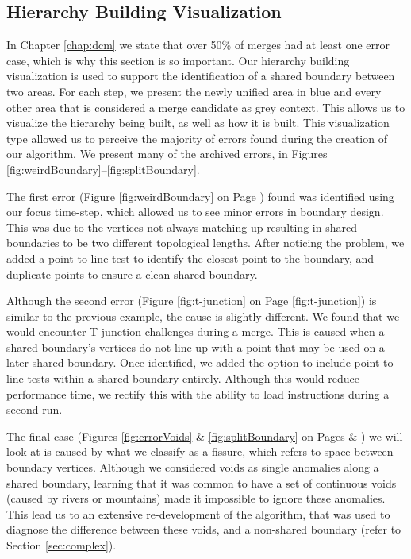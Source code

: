 \subsection{Hierarchy Building Visualization}
In Chapter \ref{chap:dcm} we state that over 50\% of merges had at least one error case, which is why this section is so important. Our hierarchy building visualization is used to support the identification of a shared boundary between two areas. For each step, we present the newly unified area in blue and every other area that is considered a merge candidate as grey context. This allows us to visualize the hierarchy being built, as well as how it is built. This visualization type allowed us to perceive the majority of errors found during the creation of our algorithm. We present many of the archived errors, in Figures \ref{fig:weirdBoundary}--\ref{fig:splitBoundary}. 

The first error (Figure \ref{fig:weirdBoundary} on Page \pageref{fig:weirdBoundary}) found was identified using our focus time-step, which allowed us to see minor errors in boundary design. This was due to the vertices not always matching up resulting in shared boundaries to be two different topological lengths. After noticing the problem, we added a point-to-line test to identify the closest point to the boundary, and duplicate points to ensure a clean shared boundary.

Although the second error (Figure \ref{fig:t-junction} on Page \ref{fig:t-junction}) is similar to the previous example, the cause is slightly different. We found that we would encounter T-junction challenges during a merge. This is caused when a shared boundary's vertices do not line up with a point that may be used on a later shared boundary. Once identified, we added the option to include point-to-line tests within a shared boundary entirely. Although this would reduce performance time, we rectify this with the ability to load instructions during a second run.

The final case (Figures \ref{fig:errorVoids} \& \ref{fig:splitBoundary} on Pages \pageref{fig:errorVoids} \& \pageref{fig:splitBoundary}) we will look at is caused by what we classify as a fissure, which refers to space between boundary vertices. Although we considered voids as single anomalies along a shared boundary, learning that it was common to have a set of continuous voids (caused by rivers or mountains) made it impossible to ignore these anomalies. This lead us to an extensive re-development of the algorithm, that was used to diagnose the difference between these voids, and a non-shared boundary (refer to Section \ref{sec:complex}).

